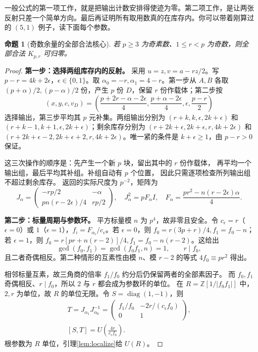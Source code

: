 \documentclass[11pt,a4paper,oneside,openany]{book}
\newcommand{\Z}{\mathbb Z}
\newcommand{\diag}{\operatorname{diag}}
\newtheorem{proposition}[theorem]{命题}
\theoremstyle{definition}
\numberwithin{equation}{chapter}
\begin{document}
一般公式的第一项工作，就是把输出计数安排得使迹为零。第二项工作，是让两张反射只差一个简单方向。最后再证明所有取用数真的在库存内。你可以带着刚算过的 $(5,1)$ 例子，读下面每个参数。
\begin{proposition}[奇数余量的全部合法核心]\label{prop:odd}
若 $p\ge3$ 为奇素数、$1\le r<p$ 为奇数，则全部合法 $K_{p,r}$ 可归零。
\end{proposition}
\begin{proof}

\par\noindent\textbf{第一步：选择两组库存内的反射。}
采用 $u=z,v=a-rz/2$。写 $p-r=4k+2\epsilon$，$\epsilon\in\{0,1\}$。取 $\alpha_0=-r,\alpha_1=4-r$。第一步从 $A,B$ 各取 $(p+\alpha)/2,(p-\alpha)/2$ 份，产生 $p$ 份 $D$，保留 $r$ 份作载体；第二步按
\[
(x,y,c,v_D)=\left(\frac{p+2r-\alpha-2\epsilon}{4},\frac{p+\alpha-2\epsilon}{4},\epsilon,\frac{p-r}{2}\right)
\]
选择输出，第三步平均其 $p$ 元补集。两组输出分别为 $(r+k,k,\epsilon,2k+\epsilon)$ 和 $(r+k-1,k+1,\epsilon,2k+\epsilon)$；剩余库存分别为 $(r+2k+\epsilon,2k+\epsilon,r,4k+2\epsilon)$ 和 $(r+2k+\epsilon-2,2k+\epsilon+2,r,4k+2\epsilon)$。唯一紧的条件是 $k+\epsilon\ge1$，由 $p-r>0$ 保证。

这三次操作的顺序是：先产生一个新 $p$ 块，留出其中的 $r$ 份作载体，
再平均一个输出组，最后平均其补组。补组自动有 $p$ 个位置，
因此只需逐项检查所列输出组不超过剩余库存。
返回的实际尺度为 $p^{-2}$，矩阵为
\[
J_\alpha=\begin{pmatrix}-rp/2&-\alpha\\pn(r-2\epsilon)/4&rp/2\end{pmatrix},
\quad J_\alpha^2=pF_\alpha I,\quad F_\alpha=\frac{pr^2-n(r-2\epsilon)\alpha}{4}.
\]

\par\noindent\textbf{第二步：标量周期与参数环。}
平方标量模 $n$ 为 $p^4$，故非零且安全。令 $c_\epsilon=r$（$\epsilon=0$）或 $1$（$\epsilon=1$），$f_i=F_{\alpha_i}/c_\epsilon$。若 $\epsilon=0$，则 $f_0=r(3p+r)/4,f_1=f_0-n$；若 $\epsilon=1$，则 $f_0=r[pr+n(r-2)]/4,f_1=f_0-n(r-2)$。这给出
\[
\gcd(f_0,f_1)=\gcd(f_0f_1,n)=1,\qquad r\mid f_0,
\]
且二者奇偶相反。第二种情形的互素性由模 $n$、模 $r-2$ 的等式 $4f_0\equiv pr^2$ 得出。

相邻标量互素，故三角商的倍率 $f_1/f_0$ 约分后仍保留两者的全部素因子。
而 $f_0,f_1$ 奇偶相反、$r\mid f_0$，所以 $2$ 与 $r$ 都会成为参数环的单位。
在 $R=\Z[1/|f_0f_1|]$ 中，$2,r$ 为单位，故 $R$ 的单位无限。令 $S=\diag(1,-1)$，则
\begin{gather*}
T=J_{\alpha_1}J_{\alpha_0}^{-1}
=\begin{pmatrix}f_1/f_0&-2r/(c_\epsilon f_0)\\0&1\end{pmatrix},\\
[S,T]=U\left(\frac{4r}{c_\epsilon f_0}\right).
\end{gather*}
根参数为 $R$ 单位，引理\ref{lem:localize}给 $U(R)$。


\end{proof}
\end{document}
